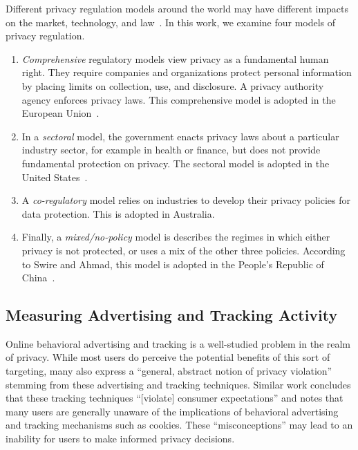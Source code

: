 \documentclass[conference]{IEEEtran}
\begin{document}
Different privacy regulation models around the world may have different impacts on the market, technology, and law~\cite{IAPPbook}. In this work, we examine four models of privacy regulation. 
\begin{enumerate}
	\item \emph{Comprehensive} regulatory models view privacy as a fundamental human right.  They require companies and organizations protect personal information by placing limits on collection, use, and disclosure. A privacy authority agency enforces privacy laws.  This comprehensive model is adopted in the European Union~\cite{IAPPbook}.  
	\item In a \emph{sectoral} model, the government enacts privacy laws about a particular industry sector, for example in health or finance, but does not provide fundamental protection on privacy.  The sectoral model is adopted in the United States~\cite{solove2006model}. 
	\item A \emph{co-regulatory} model relies on industries to develop their privacy policies for data protection.  This is adopted in Australia. 
	\item Finally, a \emph{mixed/no-policy} model is describes the regimes in which either privacy is not protected, or uses a mix of the other three policies.  According to Swire and Ahmad, this model is adopted in the People's Republic of China~\cite{IAPPbook}. 
\end{enumerate}

\subsection{Measuring Advertising and Tracking Activity}
Online behavioral advertising and tracking is a well-studied problem in the realm of privacy. While most users do perceive the potential benefits of this sort of targeting, many also express a ``general, abstract notion of privacy violation'' stemming from these advertising and tracking techniques\cite{ur2012}. Similar work concludes that these tracking techniques ``[violate] consumer expectations'' and notes that many users are generally unaware of the implications of behavioral advertising and tracking mechanisms such as cookies. These ``misconceptions'' may lead to an inability for users to make informed privacy decisions\cite{mcdonald2010}.
\end{document}
